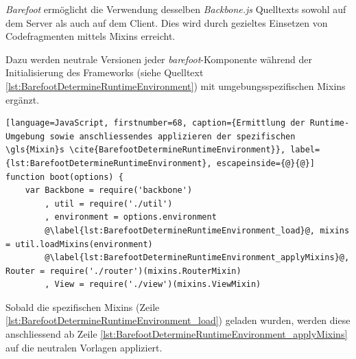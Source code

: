 \emph{Barefoot} \cite{Barefoot} ermöglicht die Verwendung desselben \emph{Backbone.js} Quelltexts sowohl auf dem Server als auch auf dem Client. Dies wird durch gezieltes Einsetzen von Codefragmenten mittels \gls{Mixin}s erreicht.

Dazu werden neutrale Versionen jeder \emph{barefoot}-Komponente während der Initialisierung des Frameworks (siehe Quelltext \ref{lst:BarefootDetermineRuntimeEnvironment}) mit umgebungsspezifischen Mixins ergänzt.

\begin{lstlisting}[language=JavaScript, firstnumber=68, caption={Ermittlung der Runtime-Umgebung sowie anschliessendes applizieren der spezifischen \gls{Mixin}s \cite{BarefootDetermineRuntimeEnvironment}}, label={lst:BarefootDetermineRuntimeEnvironment}, escapeinside={@}{@}]
function boot(options) {
	var Backbone = require('backbone')
		, util = require('./util')
		, environment = options.environment
		@\label{lst:BarefootDetermineRuntimeEnvironment_load}@, mixins = util.loadMixins(environment)
		@\label{lst:BarefootDetermineRuntimeEnvironment_applyMixins}@, Router = require('./router')(mixins.RouterMixin)
		, View = require('./view')(mixins.ViewMixin)
\end{lstlisting}

Sobald die spezifischen \gls{Mixin}s (Zeile \ref{lst:BarefootDetermineRuntimeEnvironment_load}) geladen wurden, werden diese anschliessend ab Zeile \ref{lst:BarefootDetermineRuntimeEnvironment_applyMixins} auf die neutralen Vorlagen appliziert.
